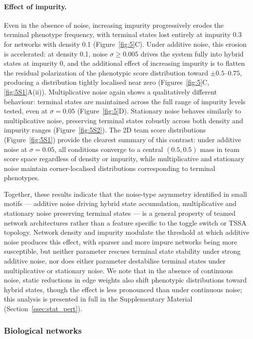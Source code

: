 \documentclass[11pt]{article}
\begin{document}
\paragraph{Effect of impurity.}
Even in the absence of noise, increasing impurity progressively erodes the terminal phenotype frequency, with terminal states lost entirely at impurity 0.3 for networks with density 0.1 (Figure~\ref{fig:5}C). Under additive noise, this erosion is accelerated: at density 0.1, noise $\sigma \geq 0.005$ drives the system fully into hybrid states at impurity 0, and the additional effect of increasing impurity is to flatten the residual polarization of the phenotypic score distribution toward $\pm 0.5$--$0.75$, producing a distribution tightly localised near zero (Figures~\ref{fig:5}C, \ref{fig:5S1}A(ii)). Multiplicative noise again shows a qualitatively different behaviour: terminal states are maintained across the full range of impurity levels tested, even at $\sigma = 0.05$ (Figure~\ref{fig:5}D). Stationary noise behaves similarly to multiplicative noise, preserving terminal states robustly across both density and impurity ranges (Figure~\ref{fig:5S2}). The 2D team score distributions (Figure~\ref{fig:5S1}) provide the clearest summary of this contrast: under additive noise at $\sigma = 0.05$, all conditions converge to a central $(0.5, 0.5)$ mass in team score space regardless of density or impurity, while multiplicative and stationary noise maintain corner-localised distributions corresponding to terminal phenotypes.

Together, these results indicate that the noise-type asymmetry identified in small motifs --- additive noise driving hybrid state accumulation, multiplicative and stationary noise preserving terminal states --- is a general property of teamed network architectures rather than a feature specific to the toggle switch or TSSA topology. Network density and impurity modulate the threshold at which additive noise produces this effect, with sparser and more impure networks being more susceptible, but neither parameter rescues terminal state stability under strong additive noise, nor does either parameter destabilise terminal states under multiplicative or stationary noise. We note that in the absence of continuous noise, static reductions in edge weights also shift phenotypic distributions toward hybrid states, though the effect is less pronounced than under continuous noise; this analysis is presented in full in the Supplementary Material (Section~\ref{ssec:stat_pert}).

\subsubsection{Biological networks}
\end{document}
